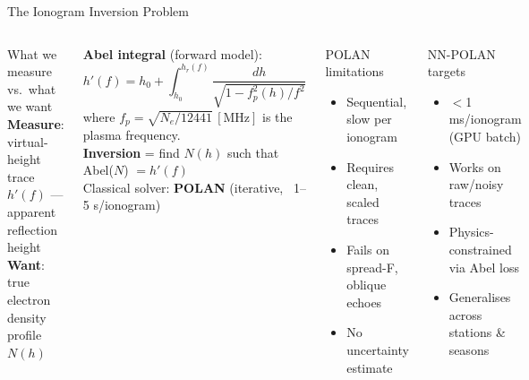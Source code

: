 \documentclass[aspectratio=169,10pt]{beamer}
\begin{document}
\begin{frame}{The Ionogram Inversion Problem}
\begin{columns}
  \begin{block}{What we measure vs.\ what we want}
    \small
    \textbf{Measure}: virtual-height trace $h'(f)$ — apparent reflection height\\
    \textbf{Want}: true electron density profile $N(h)$
  \end{block}
  \vspace{3pt}
  \textbf{Abel integral} (forward model):
  \[
    h'(f) = h_0 + \int_{h_0}^{h_r(f)} \frac{dh}{\sqrt{1 - f_p^2(h)/f^2}}
  \]
  where $f_p = \sqrt{N_e/12441}\,[\text{MHz}]$ is the plasma frequency.\\[4pt]
  \textbf{Inversion} = find $N(h)$ such that Abel($N$) $= h'(f)$\\
  Classical solver: \textbf{POLAN} (iterative, ~1--5 s/ionogram)

  \begin{alertblock}{POLAN limitations}
    \scriptsize
    \begin{itemize}
      \item[$\times$] Sequential, slow per ionogram
      \item[$\times$] Requires clean, scaled traces
      \item[$\times$] Fails on spread-F, oblique echoes
      \item[$\times$] No uncertainty estimate
    \end{itemize}
  \end{alertblock}
  \vspace{3pt}
  \begin{exampleblock}{NN-POLAN targets}
    \scriptsize
    \begin{itemize}
      \item[$\checkmark$] $<$1 ms/ionogram (GPU batch)
      \item[$\checkmark$] Works on raw/noisy traces
      \item[$\checkmark$] Physics-constrained via Abel loss
      \item[$\checkmark$] Generalises across stations \& seasons
    \end{itemize}
  \end{exampleblock}
\end{columns}
\end{frame}

\end{document}
